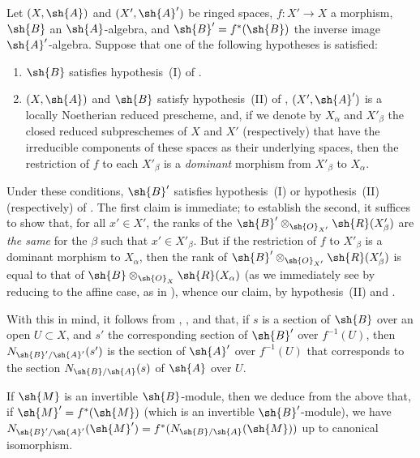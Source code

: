 \begin{env}[6.5.4]
\label{II.6.5.4}
Let $(X,\sh{A})$ and $(X',\sh{A}')$ be ringed spaces, $f:X'\to X$ a morphism, $\sh{B}$ an $\sh{A}$-algebra, and $\sh{B}'=f^*(\sh{B})$ the inverse image $\sh{A}'$-algebra.
Suppose that one of the following hypotheses is satisfied:
\begin{enumerate}
  \item $\sh{B}$ satisfies hypothesis~(I) of .
  \item $(X,\sh{A})$ and $\sh{B}$ satisfy hypothesis~(II) of , $(X',\sh{A}')$ is a locally Noetherian reduced prescheme, and, if we denote by $X_\alpha$ and $X'_\beta$ the closed reduced subpreschemes of $X$ and $X'$ (respectively) that have the irreducible components of these spaces as their underlying spaces, then the restriction of $f$ to each $X'_\beta$ is a \emph{dominant} morphism from $X'_\beta$ to $X_\alpha$.
\end{enumerate}

Under these conditions, $\sh{B}'$ satisfies hypothesis~(I) or hypothesis~(II) (respectively) of .
The first claim is immediate;
to establish the second, it suffices to show that, for all $x'\in X'$, the ranks of the $\sh{B}'\otimes_{\sh{O}_{X'}}\sh{R}(X'_\beta)$ are \emph{the same} for the $\beta$ such that $x'\in X'_\beta$.
But if the restriction of $f$ to $X'_\beta$ is a dominant morphism to $X_\alpha$, then the rank of $\sh{B}'\otimes_{\sh{O}_{X'}}\sh{R}(X'_\beta)$ is equal to that of $\sh{B}\otimes_{\sh{O}_X}\sh{R}(X_\alpha)$ (as we immediately see by reducing to the affine case, as in ), whence our claim, by hypothesis~(II) and .

With this in mind, it follows from , , and  that, if $s$ is a section of $\sh{B}$ over an open $U\subset X$, and $s'$ the corresponding section of $\sh{B}'$ over $f^{-1}(U)$, then $N_{\sh{B}'/\sh{A}'}(s')$ is the section of $\sh{A}'$ over $f^{-1}(U)$ that corresponds to the section $N_{\sh{B}/\sh{A}}(s)$ of $\sh{A}$ over $U$.

If $\sh{M}$ is an invertible $\sh{B}$-module, then we deduce from the above that, if $\sh{M}'=f^*(\sh{M})$ (which is an invertible $\sh{B}'$-module), we have $N_{\sh{B}'/\sh{A}'}(\sh{M}')=f^*(N_{\sh{B}/\sh{A}}(\sh{M}))$ up to canonical isomorphism.
\end{env}

